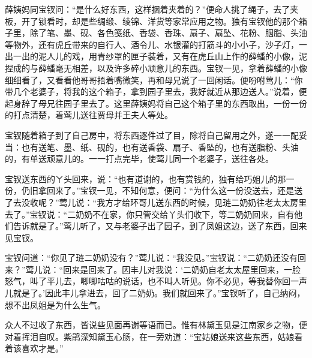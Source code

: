 \begin{parag}


    薛姨妈同宝钗问：“是什么好东西，这样捆着夹着的？”便命人挑了绳子，去了夹板，开了锁看时，却是些绸缎、绫锦、洋货等家常应用之物。独有宝钗他的那个箱子里，除了笔、墨、砚、各色笺纸、香袋、香珠、扇子、扇坠、花粉、胭脂、头油等物外，还有虎丘带来的自行人、酒令儿、水银灌的打筋斗的小小子，沙子灯，一出一出的泥人儿的戏，用青纱罩的匣子装着，又有在虎丘山上作的薛蟠的小像，泥捏成的与薛蟠毫无相差，以及许多碎小顽意儿的东西。宝钗一见，拿着薛蟠的小像细细看了，又看看他哥哥捂着嘴微笑，再和母兄说了一回闲话。便吩咐莺儿：“你带几个老婆子，将我的这个箱子，拿到园子里去，我好就近从那边送人。”说着，便起身辞了母兄往园子里去了。这里薛姨妈将自己这个箱子里的东西取出，一份一份的打点清楚，着莺儿送往贾母并王夫人等处。
\end{parag}


\begin{parag}


    宝钗随着箱子到了自己房中，将东西逐件过了目，除将自己留用之外，遂一一配妥当：也有送笔、墨、纸、砚的，也有送香袋、扇子、香坠的，也有送脂粉、头油的，有单送顽意儿的。一一打点完毕，使莺儿同一个老婆子，送往各处。
\end{parag}


\begin{parag}


    宝钗送东西的ㄚ头回来，说：“也有道谢的，也有赏钱的，独有给巧姐儿的那一份，仍旧拿回来了。”宝钗一见，不知何意，便问：“为什么这一份没送去，还是送了去没收呢？”莺儿说：“我方才给环哥儿送东西的时候，见琏二奶奶往老太太房里去了。”宝钗说：“二奶奶不在家，你只管交给丫头们收下，等二奶奶回来，自有他们告诉就是了。”莺儿听了，又与老婆子出了园子，到了凤姐这边，送了东西，回来见宝钗。
\end{parag}


\begin{parag}


    宝钗问道：“你见了琏二奶奶没有？”莺儿说：“我没见。”宝钗说：“二奶奶还没有回来？”莺儿说：“回来是回来了。因丰儿对我说：‘二奶奶自老太太屋里回来，一脸怒气，叫了平儿去，唧唧咕咕的说话，也不叫人听见。你不必见，等我替你回一声儿就是了。’因此丰儿拿进去，回了二奶奶。我们就回来了。”宝钗听了，自己纳闷，想不出凤姐是为什么生气。
\end{parag}


\begin{parag}


    众人不过收了东西，皆说些见面再谢等语而已。惟有林黛玉见是江南家乡之物，便对着挥泪自叹。紫鹃深知黛玉心肠，在一旁劝道：“宝姑娘送来这些东西，姑娘看着该喜欢才是。”
\end{parag}


